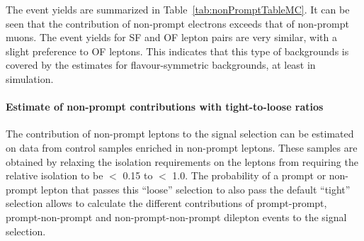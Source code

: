 The event yields are summarized in Table~\ref{tab:nonPromptTableMC}. It can be seen that the contribution of non-prompt electrons exceeds that of non-prompt muons. The event yields for SF and OF lepton pairs are very similar, with a slight preference to OF leptons. This indicates that this type of backgrounds is covered by the estimates for flavour-symmetric backgrounds, at least in simulation.


\paragraph*{Estimate of non-prompt contributions with tight-to-loose ratios}
The contribution of non-prompt leptons to the signal selection can be estimated on data from control samples enriched in non-prompt leptons. These samples are obtained by relaxing the isolation requirements on the leptons from requiring the relative isolation to be $<$ 0.15 to $<$ 1.0. The probability of a prompt or non-prompt lepton that passes this ``loose'' selection to also pass the default ``tight'' selection allows to calculate the different contributions of prompt-prompt, prompt-non-prompt and non-prompt-non-prompt dilepton events to the signal selection. 

